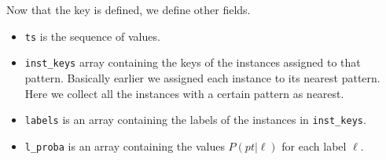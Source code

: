Now that the key is defined, we define other fields.

\begin{itemize}
    \item \texttt{ts} is the sequence of values.
    \item \texttt{inst\_keys} array containing the keys of the instances assigned to that pattern.
    Basically earlier we assigned each instance to its nearest pattern. Here we collect all the
    instances with a certain pattern as nearest.
    \item \texttt{labels} is an array containing the labels of the instances in \texttt{inst\_keys}.
    \item \texttt{l\_proba} is an array containing the values $P(pt | \ell)$ for each label $\ell$.
\end{itemize}




